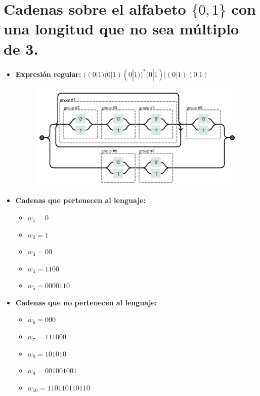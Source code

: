 \documentclass[11pt]{report}
\begin{document}
\section{Cadenas sobre el alfabeto \texorpdfstring{$\{0, 1\}$}{\{0, 1\}} con una longitud que no sea múltiplo de 3.}
\begin{itemize}
  \item \textbf{Expresión regular:} $((0|1)(0|1)(0|1))^*(0|1)|(0|1)(0|1)$
    \begin{figure}[H]
      \centering
      \includegraphics[scale=0.9]{img/op_basicos_07.png}
    \end{figure}
  \item \textbf{Cadenas que pertenecen al lenguaje: }
    \begin{itemize}
      \item $w_1 = 0$
      \item $w_2 = 1$
      \item $w_3 = 00$
      \item $w_4 = 1100$
      \item $w_5 = 0000110$
    \end{itemize}
  \item \textbf{Cadenas que no pertenecen al lenguaje: }
    \begin{itemize}
      \item $w_6 = 000$
      \item $w_7 = 111000$
      \item $w_8 = 101010$
      \item $w_9 = 001001001$
      \item $w_{10} = 110110110110$
    \end{itemize}
\end{itemize}

\newpage
\end{document}
